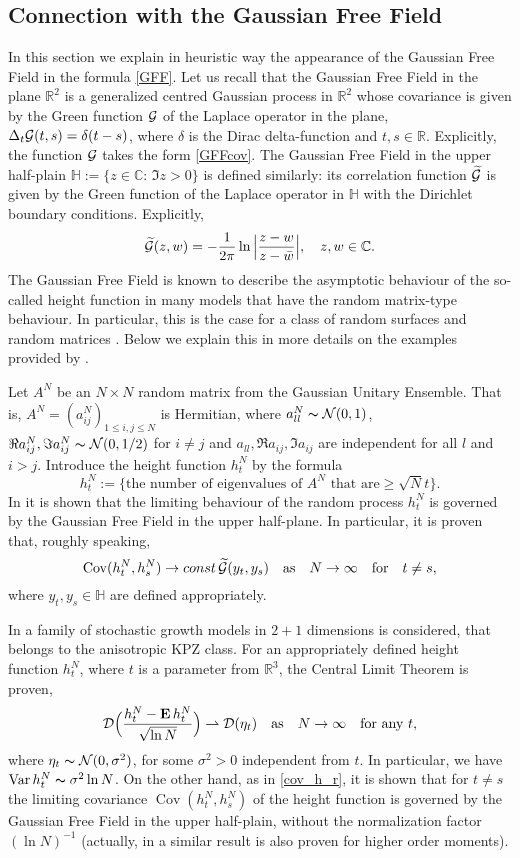 \documentclass{article}
\numberwithin{equation}{section}
\newcommand{\mC}{\mathbb{C}}
\newcommand{\mR}{\mathbb{R}}
\newcommand{\mH}{\mathbb{H}}
\newcommand{\DD}{{\cal D}}
\newcommand{\GG}{{\cal G}}
\newcommand{\NN}{{\cal N}}
\newcommand{\Cov}{\operatorname{Cov}}
\newcommand{\Var}{\operatorname{Var}}
\newcommand{\wid}{\widetilde}
\newcommand{\MO}{\mbox{\bf E}\,}
\newcommand{\volna}{\thicksim}
\newcommand{\raw}{\rightharpoonup}
\newcommand{\fr}{\frac}
\newcommand{\qmb}{\quad\mbox}
\newcommand{\lbl}{\label}
\newcommand{\ass}{\quad\mbox{as}\quad}
\newcommand{\bee}{\begin{equation}}
\newcommand{\eee}{\end{equation}}
\newcommand{\non}{\nonumber}
\begin{document}
\subsection{Connection with the Gaussian Free Field}
\lbl{sec:GFF}
In this section we explain in heuristic way the appearance of the Gaussian Free Field in the formula \eqref{GFF}.
Let us recall that the Gaussian Free Field in the plane $\mR^2$ is a  generalized centred Gaussian process in $\mR^2$ whose covariance is given by the Green function $\GG$ of the Laplace operator in the plane, $\Delta_t\GG(t,s)=\delta(t-s)$, where $\delta$ is the Dirac delta-function and $t,s\in\mR$. Explicitly, the function $\GG$ takes the form \eqref{GFFcov}.
The Gaussian Free Field in the upper half-plain $\mH:=\{z\in\mC:\,\Im z>0\}$ is defined similarly: its correlation function $\wid\GG$ is given by the Green function of the Laplace operator in $\mH$ with the Dirichlet boundary conditions. Explicitly,
$$
\wid\GG(z,w)=-\fr1{2\pi}\ln\Big|\fr{z-w}{z-\bar w}\Big|, 
\quad z,w\in\mC.
$$ 
The Gaussian Free Field is known to describe the asymptotic behaviour of the so-called height function in many models that have the random matrix-type behaviour. 
In particular, this is the case for a class of random surfaces \cite{dT,K,Du,BF,Ku,P} and random matrices \cite{Bor,BG}.
Below we explain this in more details on the examples provided by \cite{BF,Bor}.

Let $A^N$ be an $N\times N$ random matrix from the Gaussian Unitary Ensemble.
That is, $A^N=(a^N_{ij})_{1\leq i,j\leq N}$ is Hermitian, 
where $a_{ll}^N\volna\NN(0,1)$, $\Re a_{ij}^N,\Im a_{ij}^N\volna \NN(0,1/2)$ for $i\neq j$
and $a_{ll}, \Re a_{ij}, \Im a_{ij}$ are independent for all $l$ and $i>j$. 
Introduce the height function $h^N_t$ by the formula
\bee\non
h^N_t:=\{\mbox{the number of eigenvalues of $A^N$ that are} \geq \sqrt{N}t\}.
\eee
In \cite {Bor} it is shown that the limiting behaviour of the random process $h^N_t$ is governed by the Gaussian Free Field in the upper half-plane. In particular, it is proven that, roughly speaking, 
\bee\lbl{cov_h_r}
\Cov(h^N_t,h^N_s)\to const\, \wid\GG(y_t,y_s) \ass N\to\infty\quad\mbox{for}\quad t\neq s,
\eee 
where $y_t,y_s\in\mH$ are defined appropriately.

In \cite{BF} a family of stochastic growth models in $2+1$ dimensions is considered, that belongs to the anisotropic KPZ class. For an appropriately defined height function $h^N_t$, where $t$ is a parameter from $\mR^3$, the Central Limit Theorem is proven,
\bee\lbl{h_CLT}
\DD\Big(\fr{h_t^N-\MO h_t^N}{\sqrt{\ln N}}\Big)\raw \DD(\eta_t) 
\ass N\to \infty
\qmb{for any }t,
\eee 
where $\eta_t\volna\NN(0,\sigma^2)$, for some $\sigma^2>0$ independent from $t$. In particular, we have $\Var h_t^N\volna \sigma^2\ln N$. 
On the other hand, as in \eqref{cov_h_r}, it is shown that for $t\neq s$ the limiting covariance $\Cov(h^N_t,h^N_s)$
of the height function is governed by the Gaussian Free Field in the upper half-plain, without the normalization factor $(\ln N)^{-1}$ (actually, in \cite{BF} a similar result is also proven for higher order moments). 
\end{document}
